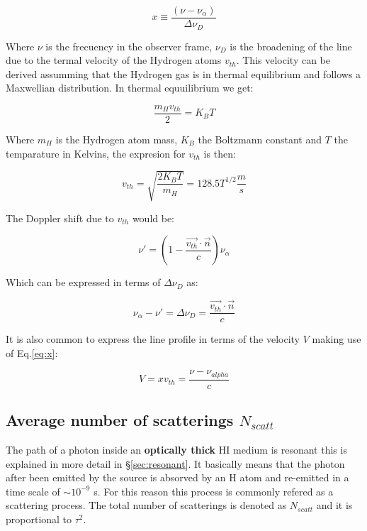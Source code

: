 \begin{equation}\label{eq:x}
x   \equiv \dfrac{(\nu -\nu_{\alpha})}{\Delta \nu_D}
\end{equation}

Where $\nu$ is the frecuency in the observer frame,
$\nu_D$ is the broadening of the line due to the termal
velocity of the Hydrogen atoms $v_{th}$. This velocity can be derived
assumming that the Hydrogen gas is in thermal equilibrium
and follows a Maxwellian distribution. In thermal equuilibrium
we get:

\begin{equation}
\dfrac{m_H v_{th}}{2} = K_B T 
\end{equation}

Where $m_H$ is the Hydrogen atom mass, $K_B$ the Boltzmann constant and $T$
the temparature in Kelvins, the expresion for $v_{th}$ is then:

\begin{equation}
v_{th} = \sqrt{\dfrac{2 K_B T}{m_H}} = 128.5 T^{1/2}\dfrac{m}{s}
\end{equation}

The Doppler shift due to $v_{th}$ would be:

\begin{equation}
\nu'= (1 - \dfrac{\vec{v_{th}}\cdot\vec{n}}{c})\nu_{\alpha}
\end{equation}

Which can be expressed in terms of $\Delta \nu_D$ as:

\begin{equation}
\nu_{\alpha} - \nu' = \Delta\nu_D =  \dfrac{\vec{v_{th}}\cdot\vec{n}}{c}
\end{equation}

It is also common to express the line profile in terms of the velocity $V$
making use of Eq.\ref{eq:x}:

\begin{equation}
V = xv_{th} = \dfrac{\nu - \nu_{alpha}}c
\end{equation}

\subsection{Average number of scatterings $N_{scatt}$}

The path of a \ly photon inside an {\bf{optically thick}}
HI medium is resonant this is explained in more detail 
in \S \ref{sec:resonant}. It basically means that the \ly photon
after been emitted by the source is absorved by an H atom
and re-emitted in a time scale of $\sim 10^{-9}$ s.
For this reason this process is commonly refered as
a scattering process. The total number of scatterings
is denoted as $N_{scatt}$ and it is proportional to
$\tau^2$.



